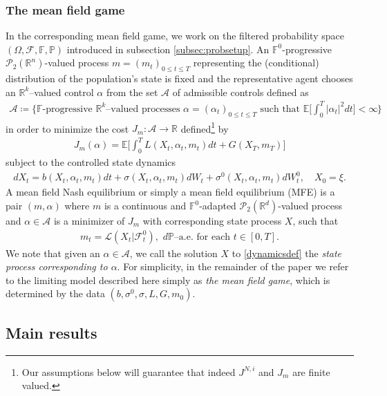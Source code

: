 \documentclass[11pt,reqno]{amsart}
\numberwithin{equation}{section}
\theoremstyle{definition}
\def\E{{\mathbb E}}
\def\R{{\mathbb R}}
\newcommand{\sP}{\mathcal{P}}
\newcommand{\sL}{\mathcal{L}}
\newcommand{\bP}{\mathbb{P}}
\newcommand{\sF}{\mathcal{F}}
\newcommand{\sA}{\mathcal{A}}
\newcommand{\bbF}{\mathbb{F}}
\def \E{\mathbb{E}}
\def \R{\mathbb{R}}
\begin{document}
\subsubsection{The mean field game} 
In the corresponding mean field game, we work on the filtered probability space $(\Omega, \sF, \bbF, \bP)$ introduced in subsection \ref{subsec:probsetup}. An $\bbF^0$-progressive $\sP_2(\R^n)$-valued process $m = (m_t)_{0 \leq t \leq T}$ representing the (conditional) distribution of the population's state is fixed and the representative agent chooses an $\R^k$--valued control $\alpha$ from the set $\sA$ of admissible controls defined as
\begin{align} \label{def:a}
  \sA \coloneqq \bigg\{\text{$\bbF$-progressive $\R^k$--valued processes $\alpha = (\alpha_t)_{0 \leq t \leq T}$ such that $\E\Big[\int_0^T |\alpha_t|^2 dt\Big] < \infty$ } \bigg\}
\end{align}
in order to minimize the cost $J_m :\sA \to \R$ defined\footnote{Our assumptions below will guarantee that indeed $J^{N,i}$ and $J_m$ are finite valued.} by
\begin{align} \label{mfopt}
  J_m(\alpha) = \E\bigg[  \int_0^T L(X_t, \alpha_t, m_t) dt + G(X_T,m_T) \bigg]
\end{align}
subject to the controlled state dynamics
\begin{align} \label{dynamicsdef}
dX_t =  b(X_t, \alpha_t, m_t) dt +\sigma(X_t,\alpha_t, m_t)d W_t + \sigma^0(X_t, \alpha_t, m_t) d W_t^0, \quad X_0 = \xi. 
\end{align}
A mean field Nash equilibrium or simply a mean field equilibrium (MFE) is a pair $(m, \alpha)$ where $m$ is a continuous and $\bbF^0$-adapted $\sP_2(\R^d)$-valued process and $\alpha \in \sA$ is a minimizer of $J_{m}$ with corresponding state process $X$, such that
\begin{align} 
  m_t = \sL(X_t | \sF_t^0), \,\, d\bP\text{--a.e. for each } t\in [0,T].
\end{align}
We note that given an $\alpha \in \sA$, we call the solution $X$ to \eqref{dynamicsdef} the \textit{state process corresponding to $\alpha$}.
 For simplicity, in the remainder of the paper we refer to the limiting model described here simply as \textit{the mean field game}, which is determined by the data $(b,\sigma^0, \sigma, L,G,m_0)$.



\subsection{Main results} 
\end{document}
